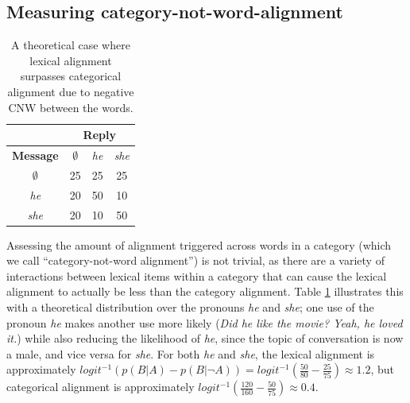 \documentclass[11pt]{article}
\begin{document}

\subsection{Measuring category-not-word-alignment}

\begin{table}[t]
\begin{center}
\begin{tabular}{|c||c|c|c|}
\hline
& \multicolumn{3}{|c|}{\bf Reply} \\
\hline
\bf Message & $\emptyset$ & \textit{he} & \textit{she} \\ \hline
$\emptyset$ & 25 & 25 & 25\\
\textit{he} & 20 & 50 & 10 \\
\textit{she} & 20 & 10 & 50 \\
\hline
\end{tabular}
\end{center}
\caption{\label{table:cnw-example1} A theoretical case where lexical alignment surpasses categorical alignment due to negative CNW between the words.}
\end{table}

Assessing the amount of alignment triggered across words in a category (which we call ``category-not-word alignment'') is not trivial, as there are a variety of interactions between lexical items within a category that can cause the lexical alignment to actually be less than the category alignment. Table \ref{table:cnw-example1} illustrates this with a theoretical distribution over the pronouns \textit{he} and \textit{she}; one use of the pronoun \textit{he} makes another use more likely (\textit{Did he like the movie? Yeah, he loved it.}) while also reducing the likelihood of \textit{he}, since the topic of conversation is now a male, and vice versa for \textit{she}. For both \textit{he} and \textit{she}, the lexical alignment is approximately $logit^{-1}(p(B|A)-p(B|\neg A)) = logit^{-1}(\frac{50}{80}-\frac{25}{75}) \approx 1.2$,
but categorical alignment is approximately $logit^{-1}(\frac{120}{160}-\frac{50}{75}) \approx 0.4$.


\end{document}
